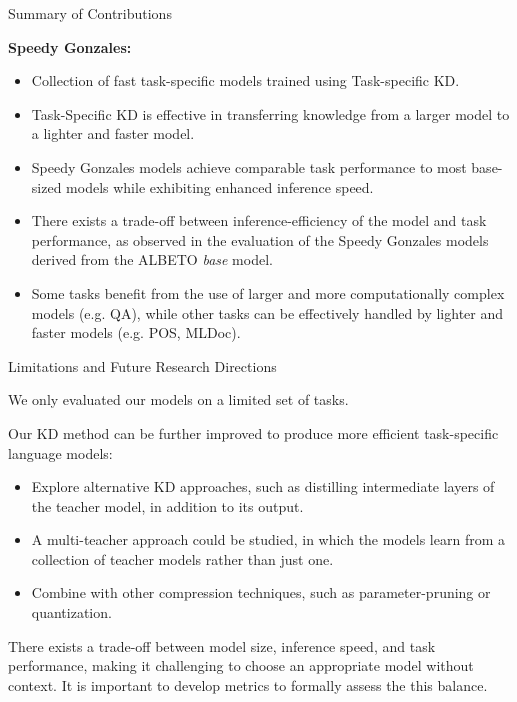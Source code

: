 \documentclass[aspectratio=169,xcolor=dvipsnames]{beamer}
\newenvironment{wideitemize}{\itemize\addtolength{\itemsep}{10pt}}{\enditemize}
\begin{document}
\begin{frame}{Summary of Contributions}

\textbf{Speedy Gonzales:}
\begin{itemize}
    \item Collection of fast task-specific models trained using Task-specific KD.
    \item Task-Specific KD is effective in transferring knowledge from a larger model to a lighter and faster model.
    \item Speedy Gonzales models achieve comparable task performance to most base-sized models while exhibiting enhanced inference speed.
    \item There exists a trade-off between inference-efficiency of the model and task performance, as observed in the evaluation of the Speedy Gonzales models derived from the ALBETO \textit{base} model.
    \item Some tasks benefit from the use of larger and more computationally complex models (e.g. QA), while other tasks can be effectively handled by lighter and faster models (e.g. POS, MLDoc).
\end{itemize}

\end{frame}
\begin{frame}{Limitations and Future Research Directions}

\begin{wideitemize}
    \item We only evaluated our models on a limited set of tasks.
    \item Our KD method can be further improved to produce more efficient task-specific language models:
    \begin{itemize}
        \item Explore alternative KD approaches, such as distilling intermediate layers of the teacher model, in addition to its output.
        \item A multi-teacher approach could be studied, in which the models learn from a collection of teacher models rather than just one.
        \item Combine with other compression techniques, such as parameter-pruning or quantization.
    \end{itemize}
    \item There exists a trade-off between model size, inference speed, and task performance, making it challenging to choose an appropriate model without context. It is important to develop metrics to formally assess the this balance.
\end{wideitemize}

\end{frame}
\end{document}
